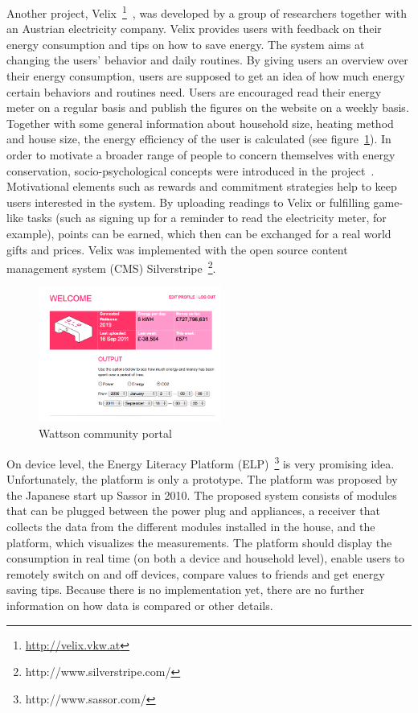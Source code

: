 Another project, Velix~\footnote{\url{http://velix.vkw.at}}~\cite{energy_efficiency_online}, was developed by a group of researchers together with an Austrian electricity company. Velix provides users with feedback on their energy consumption and tips on how to save energy. The system aims at changing the users' behavior and daily routines. By giving users an overview over their energy consumption, users are supposed to get an idea of how much energy certain behaviors and routines need.  
Users are encouraged read their energy meter on a regular basis and publish the figures on the website on a weekly basis. Together with some general information about household size, heating method and house size, the energy efficiency of the user is calculated (see figure~\ref{velix}). 
In order to motivate a broader range of people to concern themselves with energy conservation, socio-psychological concepts were introduced in the project~\cite{improving_residential_energy_consumption}. Motivational elements such as rewards and commitment strategies help to keep users interested in the system. By uploading readings to Velix or fulfilling game-like tasks (such as signing up for a reminder to read the electricity meter, for example), points can be earned, which then can be exchanged for a real world gifts and prices.  
Velix was implemented with the open source content management system (CMS) Silverstripe~\footnote{http://www.silverstripe.com/}.
  
\begin{figure}[htbp]
\begin{center}
\includegraphics[width=6cm]{Images/wattson_community.png}
\caption{Wattson community portal}
\label{velix}
\end{center}
\end{figure}  
On device level, the Energy Literacy Platform  (ELP)~\footnote{http://www.sassor.com/} is very promising idea. Unfortunately, the platform is only a prototype. The platform was proposed by the Japanese start up Sassor in 2010.
The proposed system consists of modules that can be plugged between the power plug and appliances, a receiver that collects the data from the different modules installed in the house, and the platform, which visualizes the measurements. The platform should display the consumption in real time (on both a device and household level), enable users to remotely switch on and off devices, compare values to friends and get energy saving tips.
Because there is no implementation yet, there are no further information on how data is compared or other details.